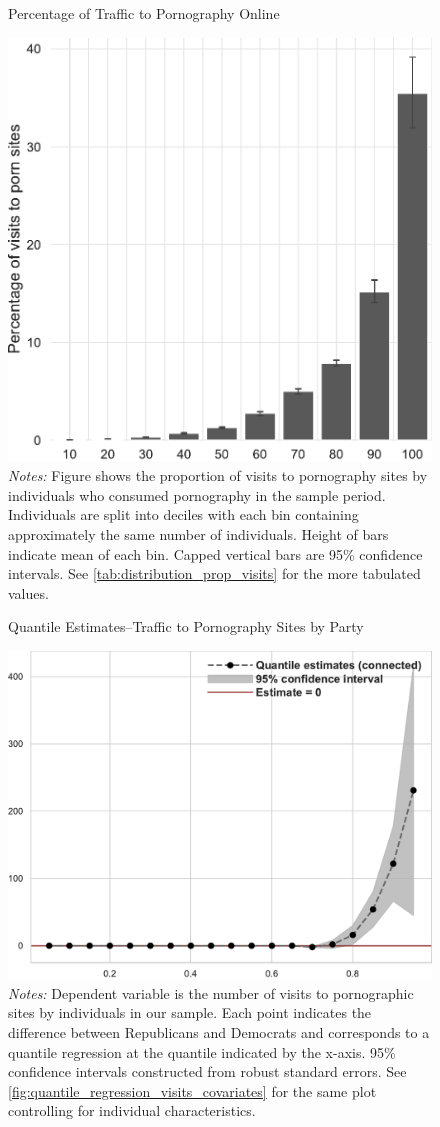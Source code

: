 \documentclass[12pt, letterpaper]{article}
\begin{document}
\begin{figure}
	\centering
	\caption{Percentage of Traffic to Pornography Online}
	\includegraphics[width=.5\linewidth]{../figs/distribution_proportion_visits_to_adultsites.pdf}
	\caption*{\footnotesize \emph{Notes:} 
		Figure shows the proportion of visits to pornography sites by individuals who consumed pornography in the sample period.
		Individuals are split into deciles with each bin containing approximately the same number of individuals.
		Height of bars indicate mean of each bin.
		Capped vertical bars are 95\% confidence intervals.
		See \cref{tab:distribution_prop_visits} for the more tabulated values.
	}
	\label{fig:distribution_prop_visits}
\end{figure}

\begin{figure}
	\centering
	\caption{Quantile Estimates--Traffic to Pornography Sites by Party}
	\includegraphics[width=.6\linewidth]{../figs/quantile_reg_visits_adult.pdf}
	\caption*{\footnotesize \emph{Notes:} 
		Dependent variable is the number of visits to pornographic sites by individuals in our sample.
		Each point indicates the difference between Republicans and Democrats and corresponds to a quantile regression at the quantile indicated by the x-axis.
		95\% confidence intervals constructed from robust standard errors.
		See \cref{fig:quantile_regression_visits_covariates} for the same plot controlling for individual characteristics.
	}
	\label{fig:quantile_regression_visits}
\end{figure}
\end{document}
